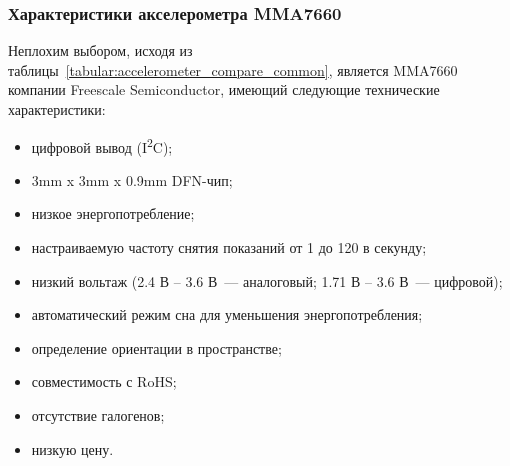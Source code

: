\documentclass[document.tex]{subfiles}
\begin{document}
\begin{table}[h]
\medskip
{}
\medskip
\caption{Общие характеристики цифровых акселерометров}
\label{tabular:accelerometer_compare_common}
\end{table}

\clearpage
\subsubsection{Характеристики акселерометра MMA7660}
Неплохим выбором, исходя из таблицы~\ref{tabular:accelerometer_compare_common}, является MMA7660 компании Freescale Semiconductor, имеющий следующие технические характеристики:
\begin{itemize}
	\item цифровой вывод (I\textsuperscript{2}C);
	\item 3mm x 3mm x 0.9mm DFN-чип; 
	\item низкое энергопотребление;
	\item настраиваемую частоту снятия показаний от 1 до 120 в секунду;
	\item низкий вольтаж (2.4 В -- 3.6 В~--- аналоговый; 1.71 В -- 3.6 В~--- цифровой);
	\item автоматический режим сна для уменьшения энергопотребления;
	\item определение ориентации в пространстве;
	\item совместимость с RoHS;
	\item отсутствие галогенов;
	\item низкую цену.
\end{itemize}
\end{document}
